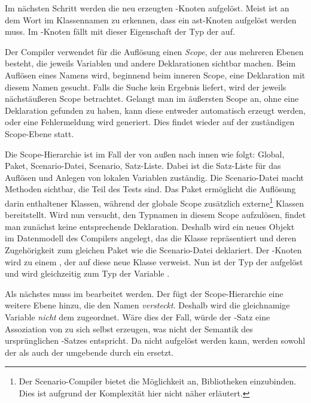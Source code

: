 

Im nächsten Schritt werden die neu erzeugten -Knoten aufgelöst.
Meist ist an dem Wort  im Klassennamen zu erkennen, dass ein \ac{ast}-Knoten aufgelöst werden muss.
Im -Knoten fällt mit dieser Eigenschaft der Typ der  auf.

Der Compiler verwendet für die Auflösung einen \emph{Scope}, der aus mehreren Ebenen besteht, die jeweils Variablen und andere Deklarationen sichtbar machen.
Beim Auflösen eines Namens wird, beginnend beim inneren Scope, eine Deklaration mit diesem Namen gesucht.
Falls die Suche kein Ergebnis liefert, wird der jeweils nächstäußeren Scope betrachtet.
Gelangt man im äußersten Scope an, ohne eine Deklaration gefunden zu haben, kann diese entweder automatisch erzeugt werden, oder eine Fehlermeldung wird generiert.
Dies findet wieder auf der zuständigen Scope-Ebene statt.

Die Scope-Hierarchie ist im Fall der  von außen nach innen wie folgt:
Global, Paket, Scenario-Datei, Scenario, Satz-Liste.
Dabei ist die Satz-Liste für das Auflösen und Anlegen von lokalen Variablen zuständig.
Die Scenario-Datei macht Methoden sichtbar, die Teil des Tests sind.
Das Paket ermöglicht die Auflösung darin enthaltener Klassen, während der globale Scope zusätzlich externe\footnote{Der Scenario-Compiler bietet die Möglichkeit an, Bibliotheken einzubinden.
Dies ist aufgrund der Komplexität hier nicht näher erläutert.} Klassen bereitstellt.
Wird nun versucht, den Typnamen  in diesem Scope aufzulösen, findet man zunächst keine entsprechende Deklaration.
Deshalb wird ein neues Objekt im Datenmodell des Compilers angelegt, das die Klasse  repräsentiert und deren Zugehörigkeit zum gleichen Paket wie die Scenario-Datei deklariert.
Der -Knoten wird zu einem , der auf diese neue Klasse verweist.
Nun ist der Typ der  aufgelöst und wird gleichzeitig zum Typ der Variable .

Als nächstes muss  im  bearbeitet werden.
Der  fügt der Scope-Hierarchie eine weitere Ebene hinzu, die den Namen  \emph{versteckt}.
Deshalb wird die gleichnamige Variable \emph{nicht} dem  zugeordnet.
Wäre dies der Fall, würde der -Satz eine Assoziation von  zu sich selbst erzeugen, was nicht der Semantik des ursprünglichen -Satzes entspricht.
Da  nicht aufgelöst werden kann, werden sowohl der  als auch der umgebende  durch ein  ersetzt.

